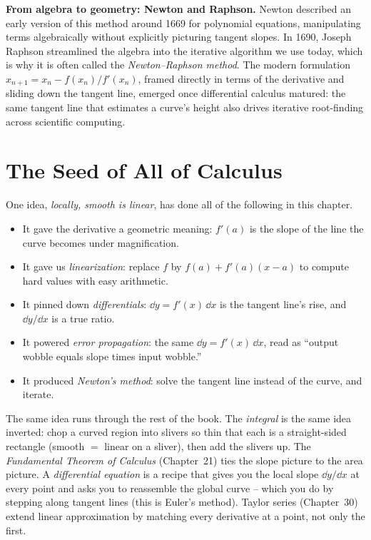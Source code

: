 \begin{intuitionbox}
\textbf{From algebra to geometry: Newton and Raphson.}
Newton described an early version of this method around 1669 for polynomial equations,
manipulating terms algebraically without explicitly picturing tangent slopes. In 1690,
Joseph Raphson streamlined the algebra into the iterative algorithm we use today, which
is why it is often called the \emph{Newton--Raphson method}. The modern formulation
$x_{n+1}=x_n-f(x_n)/f'(x_n)$, framed directly in terms of the derivative and sliding
down the tangent line, emerged once differential calculus matured: the same tangent
line that estimates a curve's height also drives iterative root-finding across
scientific computing.
\end{intuitionbox}

\section{The Seed of All of Calculus}
\label{ch14:seed}

One idea, \emph{locally, smooth is linear}, has done all of the following in this
chapter.

\begin{itemize}
\item It gave the derivative a geometric meaning: $f'(a)$ is the slope of the
line the curve becomes under magnification.
\item It gave us \emph{linearization}: replace $f$ by $f(a)+f'(a)(x-a)$ to compute
hard values with easy arithmetic.
\item It pinned down \emph{differentials}: $\dd y = f'(x)\,\dd x$ is the tangent
line's rise, and $\dd y/\dd x$ is a true ratio.
\item It powered \emph{error propagation}: the same $\dd y = f'(x)\,\dd x$, read
as ``output wobble equals slope times input wobble.''
\item It produced \emph{Newton's method}: solve the tangent line instead of the
curve, and iterate.
\end{itemize}

The same idea runs through the rest of the book. The \emph{integral} is the same idea
inverted: chop a curved region into slivers so thin that each is a straight-sided
rectangle (smooth $=$ linear on a sliver), then add the slivers up. The
\emph{Fundamental Theorem of Calculus} (Chapter~21) ties the slope picture to the area picture. A
\emph{differential equation} is a recipe that gives you the local slope $\dd
y/\dd x$ at every point and asks you to reassemble the global curve -- which you do
by stepping along tangent lines (this is Euler's method). Taylor series
(Chapter~30) extend linear approximation by matching every derivative at a point,
not only the first.

